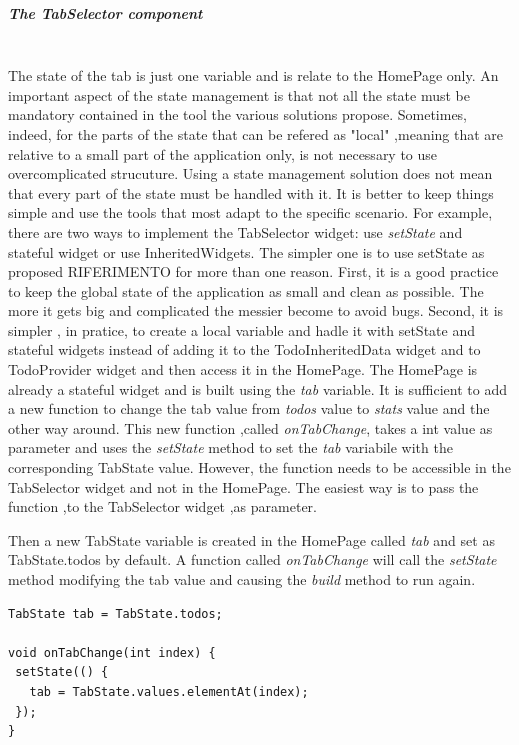 \subparagraph{The TabSelector component}\mbox{}\\
\label{subpar:todo_app_inherited_widget_tabselector_component}
The state of the tab is just one variable and is relate to the HomePage only. An important aspect of the state management is that not all the state must be mandatory contained in the tool the various solutions propose. Sometimes, indeed, for the parts of the state that can be refered as "local" ,meaning that are relative to a small part of the application only, is not necessary to use overcomplicated strucuture. Using a state management solution does not mean that every part of the state must be handled with it. It is better to keep things simple and use the tools that most adapt to the specific scenario.
For example, there are two ways to implement the TabSelector widget: use \textit{setState} and stateful widget or use InheritedWidgets. The simpler one is to use setState as proposed RIFERIMENTO for more than one reason. First, it is a good practice to keep the global state of the application as small and clean as possible. The more it gets big and complicated the messier become to avoid bugs. Second, it is simpler , in pratice, to create a local variable and hadle it with setState and stateful widgets instead of adding it to the TodoInheritedData widget and to TodoProvider widget and then access it in the HomePage. The HomePage is already a stateful widget and is built using the \textit{tab }variable. It is sufficient to add a new function to change the tab value from \textit{todos} value to \textit{stats} value and the other way around. This new function ,called \textit{onTabChange}, takes a int value as parameter and uses the \textit{setState} method to set the \textit{tab} variabile with the corresponding TabState value. However, the function needs to be accessible in the TabSelector widget and not in the HomePage. The easiest way is to pass the function ,to the TabSelector widget ,as parameter.

Then a new TabState variable is created in the HomePage called \textit{tab} and set as TabState.todos by default. A function called \textit{onTabChange} will call the \textit{setState} method modifying the tab value and causing the \textit{build} method to run again. 
\mbox{}\\


\begin{verbatim}
TabState tab = TabState.todos;

void onTabChange(int index) {
 setState(() {
   tab = TabState.values.elementAt(index);
 });
}
\end{verbatim}

